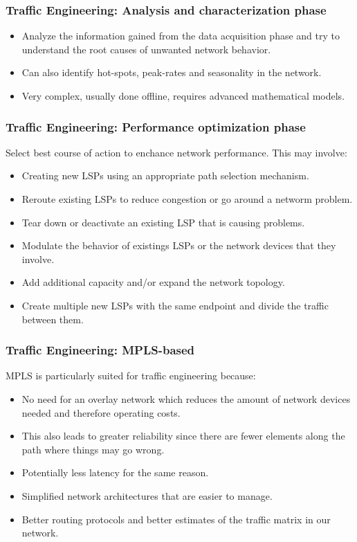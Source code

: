 \documentclass[12pt]{beamer}
\begin{document}
\begin{frame}
  \frametitle{Traffic Engineering: Analysis and characterization phase}
    \begin{itemize}
      \item Analyze the information gained from the data acquisition phase and try to understand the root causes of unwanted network behavior.
      \item Can also identify hot-spots, peak-rates and seasonality in the network.
      \item Very complex, usually done offline, requires advanced mathematical models.
    \end{itemize}
\end{frame}

\begin{frame}
  \frametitle{Traffic Engineering: Performance optimization phase}
  Select best course of action to enchance network performance. This may involve:
    \begin{itemize}
      \item Creating new LSPs using an appropriate path selection mechanism.
      \item Reroute existing LSPs to reduce congestion or go around a networm problem.
      \item Tear down or deactivate an existing LSP that is causing problems.
      \item Modulate the behavior of existings LSPs or the network devices that they involve.
      \item Add additional capacity and/or expand the network topology.
      \item Create multiple new LSPs with the same endpoint and divide the traffic between them.
    \end{itemize}
\end{frame}

\begin{frame}
  \frametitle{Traffic Engineering: MPLS-based}
  MPLS is particularly suited for traffic engineering because:
    \begin{itemize}
      \item No need for an overlay network which reduces the amount of network devices needed and therefore operating costs.
      \item This also leads to greater reliability since there are fewer elements along the path where things may go wrong.
      \item Potentially less latency for the same reason.
      \item Simplified network architectures that are easier to manage.
      \item Better routing protocols and better estimates of the traffic matrix in our network.
    \end{itemize}
\end{frame}
\end{document}

